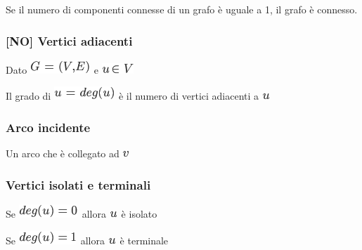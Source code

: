 \documentclass{article}
\begin{document}
{}

{Se il numero di componenti connesse di un grafo è uguale a 1, }{il
grafo è connesso.}

\hypertarget{h.5nknzat57p06}{\subsubsection{\texorpdfstring{{{[}NO{]}
Vertici adiacenti}}{{[}NO{]} Vertici adiacenti}}\label{h.5nknzat57p06}}

{Dato }\includegraphics{images/image335.png}{~e
}\includegraphics{images/image357.png}

{Il grado di }\includegraphics{images/image358.png}{~è il numero di
vertici adiacenti a }\includegraphics{images/image103.png}

\hypertarget{h.52hqmabofvh0}{\subsubsection{\texorpdfstring{{Arco
incidente}}{Arco incidente}}\label{h.52hqmabofvh0}}

{Un arco che è collegato ad }\includegraphics{images/image76.png}

\hypertarget{h.vm6z084zc6rf}{\subsubsection{\texorpdfstring{{Vertici
isolati e
terminali}}{Vertici isolati e terminali}}\label{h.vm6z084zc6rf}}

{Se }\includegraphics{images/image359.png}{~allora
}\includegraphics{images/image103.png}{~è isolato}

{Se }\includegraphics{images/image360.png}{~allora
}\includegraphics{images/image103.png}{~è terminale}
\end{document}
